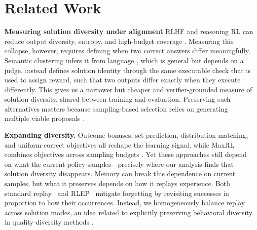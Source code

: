 \section{Related Work}
\label{sec:related}

\textbf{Measuring solution diversity under alignment} RLHF and reasoning RL can reduce
output diversity, entropy, and high-budget coverage
\citep{kirk2024understanding,dang2025diversity,cui2025entropy,yue2025rlvrlimit}.
Measuring this collapse, however, requires defining when two correct answers differ meaningfully.
Semantic clustering infers it from language \citep{farquhar2024detecting}, which is general but depends on a judge.
\mb{} instead defines solution identity through the same executable check that is used to assign reward, such that two outputs differ exactly when they execute differently.
This gives us a narrower but cheaper and verifier-grounded measure of solution diversity, shared between training and evaluation. Preserving such alternatives matters because sampling-based selection relies on generating multiple viable proposals \citep{brown2024monkeys,snell2024testtime,cobbe2021training,lightman2023lets}.





\textbf{Expanding diversity.} 
Outcome bonuses, set prediction, distribution matching, and uniform-correct objectives all reshape the learning signal\citep{song2025outcome,chen2025passktraining,li2025divergence,li2026setpo,li2026distribution,lochab2026ucpo}, while MaxRL combines objectives across sampling budgets \citep{tajwar2026maxrl}.
Yet these approaches still depend on what the current policy samples---precisely where our analysis finds that solution diversity disappears.
Memory can break this dependence on current samples, but what it preserves depends on how it replays experience.
Both standard replay~\citep{lin1992selfimproving,rolnick2019replay} and RLEP~\citep{zhang2025rlep} mitigate forgetting by revisiting successes in proportion to how their occurrences.
Instead, we homogeneously balance replay across solution modes, an idea related to explicitly preserving behavioral diversity in quality-diversity methods \citep{mouret2015illuminating,ecoffet2021return}.



